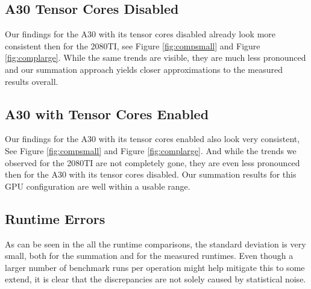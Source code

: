 \documentclass[conference]{IEEEtran}
\begin{document}
\subsection{A30 Tensor Cores Disabled}
Our findings for the A30 with its tensor cores disabled already look more consistent then for the 2080TI, see Figure \ref{fig:compsmall} and Figure \ref{fig:complarge}. While the same trends are visible, they are much less pronounced and our summation approach yields closer approximations to the measured results overall. 



\subsection{A30 with Tensor Cores Enabled}
Our findings for the A30 with its tensor cores enabled also look very consistent, See Figure \ref{fig:compsmall} and Figure \ref{fig:complarge}. And while the trends we observed for the 2080TI are not completely gone, they are even less pronounced then for the A30 with its tensor cores disabled. Our summation results for this GPU configuration are well within a usable range. 

\subsection{Runtime Errors}
As can be seen in the all the runtime comparisons, the standard deviation is very small, both for the summation and for the measured runtimes. Even though a larger number of benchmark runs per operation might help mitigate this to some extend, it is clear that the discrepancies are not solely caused by statistical noise.  
\end{document}
